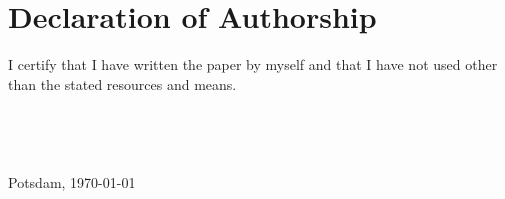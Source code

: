 \chapter*{Declaration of Authorship}
\thispagestyle{empty}   
I certify that I have written the paper by myself and that I have not  
used other than the stated resources and means.
\\
\\
\\
\\
\\
Potsdam, \today
\\
\\
\\
\\
\AUTHOR

